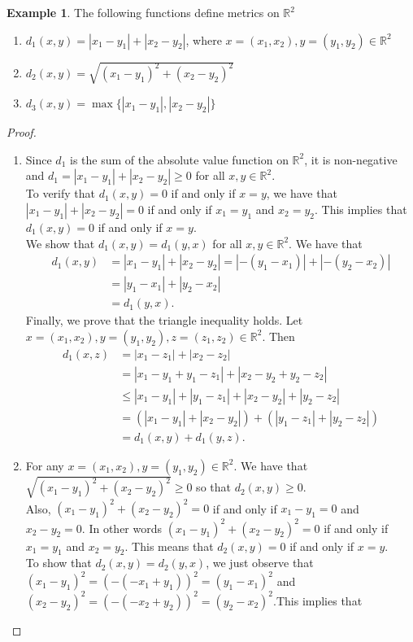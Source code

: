 \documentclass[11pt,a4paper]{article}
\theoremstyle{definition}
\newtheorem{exa}[thm]{Example}
\begin{document}
\begin{exa}
The following functions define metrics on $\mathbb{R}^2$
\begin{enumerate}
\item[i] $d_1(x,y)=|x_1-y_1|+|x_2-y_2|$, where $x=(x_1,x_2), y=(y_1,y_2)\in \mathbb{R}^2$
\item[ii] $d_2(x,y)=\sqrt{(x_1-y_1)^2 +(x_2-y_2)^2}$
\item[iii] $d_3(x,y)=\max\{|x_1-y_1|,|x_2-y_2|\}$
\end{enumerate}
\end{exa}




\begin{proof}
\begin{enumerate}
\item[i]  Since $d_1$ is the sum of the absolute value function on $\mathbb{R}^2$, it is non-negative and $d_1=|x_1-y_1|+|x_2-y_2| \geq 0$ for all $x,y\in \mathbb{R}^2$.\\ To verify that $d_1(x,y)=0$ if and only if $x=y$, we have that $|x_1-y_1|+|x_2-y_2|=0$ if and only if $x_1=y_1$ and $x_2=y_2$. This implies that $d_1(x,y)=0$ if and only if $x=y$.\\ We show that $d_1(x,y)=d_1(y,x)$ for all $x,y\in \mathbb{R}^2$. We have that 
\begin{align*}
d_1(x,y) & =|x_1-y_1|+|x_2-y_2|=|-(y_1-x_1)|+|-(y_2-x_2)|\\
         & =|y_1-x_1|+|y_2-x_2|\\
         & = d_1(y,x).
\end{align*}         
Finally, we prove that the triangle inequality holds. Let $x=(x_1,x_2), y=(y_1,y_2), z=(z_1,z_2)\in \mathbb{R}^2$. Then 
\begin{align*}
d_1(x,z) &=|x_1-z_1|+|x_2-z_2|\\
         &=|x_1-y_1+y_1-z_1|+|x_2-y_2+y_2-z_2|\\
         &\leq |x_1-y_1|+|y_1-z_1|+|x_2-y_2|+|y_2-z_2|\\
         &=(|x_1-y_1|+|x_2-y_2|) +(|y_1-z_1|+|y_2-z_2|)\\
         &=d_1(x,y)+d_1(y,z).
\end{align*}





\item[ii] For any $x=(x_1,x_2), y=(y_1,y_2)\in \mathbb{R}^2$. We have that $\sqrt{(x_1-y_1)^2+(x_2-y_2)^2}\geq 0$ so that $d_2(x,y)\geq 0$.\\ Also, $(x_1-y_1)^2+(x_2-y_2)^2=0$ if and only if $x_1-y_1=0$ and $x_2-y_2=0$. In other words $(x_1-y_1)^2+(x_2-y_2)^2=0$ if and only if $x_1=y_1$ and $x_2=y_2$. This means that $d_2(x,y)=0$ if and only if $x=y$.\\ To show that $d_2(x,y)=d_2(y,x)$, we just observe that  $(x_1-y_1)^2=(-(-x_1+y_1))^2=(y_1-x_1)^2$ and $(x_2-y_2)^2=(-(-x_2+y_2))^2=(y_2-x_2)^2$.This implies that


\end{enumerate}
\end{proof}
\end{document}
